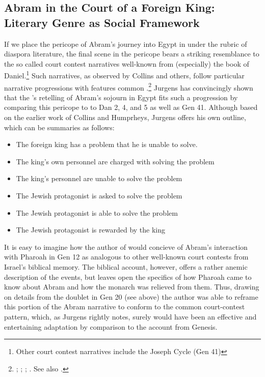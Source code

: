 \subsection{Abram in the Court of a Foreign King: Literary Genre as Social Framework}

If we place the pericope of Abram's journey into Egypt in \ga under the rubric of diaspora literature, the final scene in the pericope bears a striking resemblance to the so called court contest narratives well-known from (especially) the book of Daniel.\footnote{Other court contest narratives include the Joseph Cycle (Gen 41)} Such narratives, as observed by Collins and others, follow particular narrative progressions with features common .\footnote{\cite[TODO: pages]{collins1993}; \cite{humphreys_jbl1973}; \cite{collins_jbl1975}; \cite{wills1990}. See also \cite{niditch-doran_jbl1977}.} Jurgens has convincingly shown that the \ga's retelling of Abram's sojourn in Egypt fits such a progression by comparing this pericope to to Dan 2, 4, and 5 as well as Gen 41. Although based on the earlier work of Collins and Humprheys, Jurgens offers his own outline, which can be summaries as follows\autocite[21]{jurgens_jsj2018}:

\begin{itemize}
    \item The foreign king has a problem that he is unable to solve.
    \item The king's own personnel are charged with solving the problem
    \item The king's personnel are unable to solve the problem
    \item The Jewish protagonist is asked to solve the problem
    \item The Jewish protagonist is able to solve the problem
    \item The Jewish protagonist is rewarded by the king
\end{itemize}

It is easy to imagine how the author of \ga would concieve of Abram's interaction with Pharoah in Gen 12 as analogous to other well-known court contests from Israel's biblical memory. The biblical account, however, offers a rather anemic description of the events, but leaves open the specifics of how Pharoah came to know about Abram and how the monarch was relieved from them. Thus, drawing on details from the doublet in Gen 20 (see above) the author was able to reframe this portion of the Abram narrative to conform to the common court-contest pattern, which, as Jurgens rightly notes, surely would have been an effective and entertaining adaptation by comparison to the account from Genesis.

